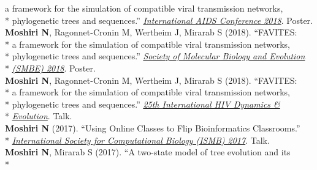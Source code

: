 \documentclass[margin,line]{res}
\begin{document}
\begin{resume}
\hspace*{9mm} a framework for the simulation of compatible viral transmission networks,\\*\vspace{2mm}
\hspace*{8mm} phylogenetic trees and sequences.'' \href{https://www.aids2018.org/}{\textit{International AIDS Conference 2018}}. Poster.\\
\hspace*{4mm} \textbf{Moshiri N}, Ragonnet-Cronin M, Wertheim J, Mirarab S (2018). ``FAVITES:\\*
\hspace*{9mm} a framework for the simulation of compatible viral transmission networks,\\*
\hspace*{9mm} phylogenetic trees and sequences.'' \href{https://smbe.org/smbe/SMBE2018Meeting/}{\textit{Society of Molecular Biology and Evolution}}\\*\vspace{2mm}
\hspace*{8mm} \href{https://smbe.org/smbe/SMBE2018Meeting/}{\textit{(SMBE) 2018}}. Poster.\\
\hspace*{4mm} \textbf{Moshiri N}, Ragonnet-Cronin M, Wertheim J, Mirarab S (2018). ``FAVITES:\\*
\hspace*{9mm} a framework for the simulation of compatible viral transmission networks,\\*
\hspace*{9mm} phylogenetic trees and sequences.'' \href{https://cme.ucsd.edu/hivdynamics/}{\textit{25th International HIV Dynamics \&}}\\*\vspace{2mm}
\hspace*{8mm} \href{https://cme.ucsd.edu/hivdynamics/}{\textit{Evolution}}. Talk.\\
\hspace*{4mm} \textbf{Moshiri N} (2017). ``Using Online Classes to Flip Bioinformatics Classrooms.''\\*\vspace{2mm}
\hspace*{8mm} \href{https://www.iscb.org/cms_addon/conferences/ismbeccb2017/technologytrack.php}{\textit{International Society for Computational Biology (ISMB) 2017}}. Talk.\\
\hspace*{4mm} \textbf{Moshiri N}, Mirarab S (2017). ``A two-state model of tree evolution and its\\*

\end{resume}
\end{document}
